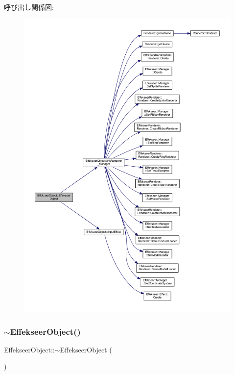 呼び出し関係図\+:
\nopagebreak
\begin{figure}[H]
\begin{center}
\leavevmode
\includegraphics[width=350pt]{class_effekseer_object_a8e1e081f62efa87b31e00bcfd9cf1a45_cgraph}
\end{center}
\end{figure}
\mbox{\label{class_effekseer_object_a0463ba508e3c83576991138465847054}} 
\subsubsection{\texorpdfstring{$\sim$\+Effekseer\+Object()}{~EffekseerObject()}}
{\footnotesize\ttfamily Effekseer\+Object\+::$\sim$\+Effekseer\+Object (\begin{DoxyParamCaption}{ }\end{DoxyParamCaption})\hspace{0.3cm}{\ttfamily [virtual]}}



